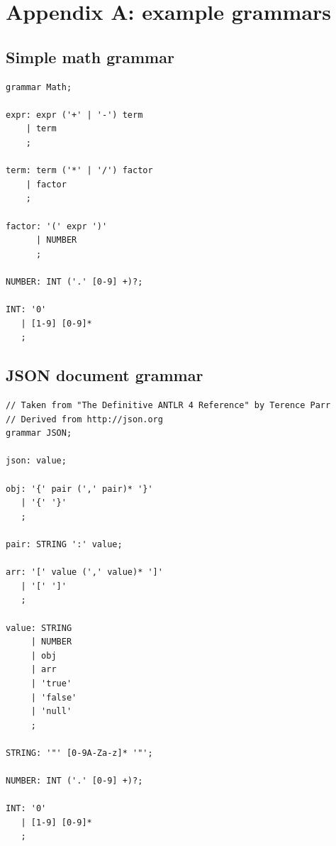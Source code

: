 \documentclass[]{usiinfbachelorproject}
\begin{document}

\newpage

\section{Appendix A\@: example grammars}

\subsection*{Simple math grammar}

\begin{lstlisting}[caption={Math.g4},
                   label={lst:app-grammar-math},
                   style=antlr]
grammar Math;

expr: expr ('+' | '-') term
    | term
    ;

term: term ('*' | '/') factor
    | factor
    ;

factor: '(' expr ')'
      | NUMBER
      ;

NUMBER: INT ('.' [0-9] +)?;

INT: '0'
   | [1-9] [0-9]*
   ;
\end{lstlisting}

\newpage

\subsection*{JSON document grammar}

\begin{lstlisting}[caption={JSON.g4},
                   label={lst:app-grammar-json},
                   style=antlr]
// Taken from "The Definitive ANTLR 4 Reference" by Terence Parr
// Derived from http://json.org
grammar JSON;

json: value;

obj: '{' pair (',' pair)* '}'
   | '{' '}'
   ;

pair: STRING ':' value;

arr: '[' value (',' value)* ']'
   | '[' ']'
   ;

value: STRING
     | NUMBER
     | obj
     | arr
     | 'true'
     | 'false'
     | 'null'
     ;

STRING: '"' [0-9A-Za-z]* '"';

NUMBER: INT ('.' [0-9] +)?;

INT: '0'
   | [1-9] [0-9]*
   ;
\end{lstlisting}
\end{document}
